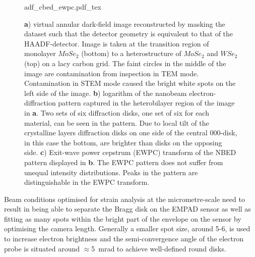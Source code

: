 \begin{figure}
	\centering
	\def\svgwidth{0.9\linewidth}
	{adf_cbed_ewpc.pdf_tex}
	\caption{\textbf{a}) virtual annular dark-field image reconstructed by masking the dataset such that the detector geometry is equivalent to that of the HAADF-detector. Image is taken at the transition region of monolayer $MoSe_2$ (bottom) to a heterostructure of $MoSe_2$ and $WSe_2$ (top) on a lacy carbon grid. The faint circles in the middle of the image are contamination from inspection in TEM mode. Contamination in STEM mode caused the bright white spots on the left side of the image. \textbf{b}) logarithm of the nanobeam electron-diffraction pattern captured in the heterobilayer region of the image in \textbf{a}. Two sets of six diffraction disks, one set of six for each material, can be seen in the pattern. Due to local tilt of the crystalline layers diffraction disks on one side of the central $000$-disk, in this case the bottom, are brighter than disks on the opposing side. \textbf{c}) Exit-wave power cepstrum (EWPC) transform of the NBED pattern displayed in \textbf{b}. The EWPC pattern does not suffer from unequal intensity distributions. Peaks in the pattern are distinguishable in the EWPC transform.}
	\label{fig:adf_nbed_ewpc}
\end{figure}

Beam conditions optimised for strain analysis at the micrometre-scale need to result in being able to separate the Bragg disk on the EMPAD sensor as well as fitting as many spots within the bright part of the envelope on the sensor by optimising the camera length. Generally a smaller spot size, around 5-6, is used to increase electron brightness and the semi-convergence angle of the electron probe is situated around $\approx$\SI{5}{\milli\radian} to achieve well-defined round disks. 


